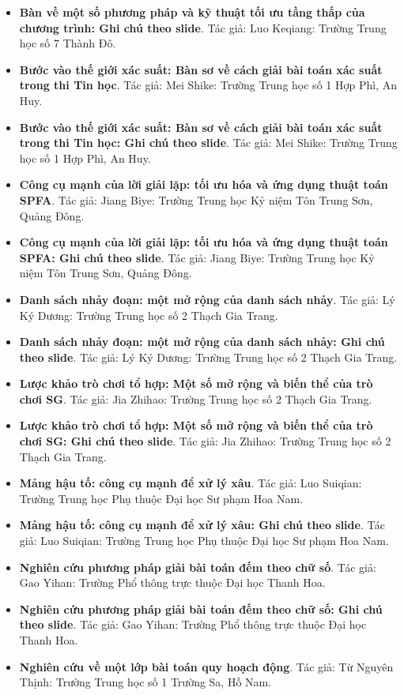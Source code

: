 \documentclass[11pt]{article}
\begin{document}
\begin{itemize}[leftmargin=2em]
  \item \textbf{Bàn về một số phương pháp và kỹ thuật tối ưu tầng thấp của chương trình: Ghi chú theo slide}. Tác giả: Luo Keqiang: Trường Trung học số 7 Thành Đô.
  \item \textbf{Bước vào thế giới xác suất: Bàn sơ về cách giải bài toán xác suất trong thi Tin học}. Tác giả: Mei Shike: Trường Trung học số 1 Hợp Phì, An Huy.
  \item \textbf{Bước vào thế giới xác suất: Bàn sơ về cách giải bài toán xác suất trong thi Tin học: Ghi chú theo slide}. Tác giả: Mei Shike: Trường Trung học số 1 Hợp Phì, An Huy.
  \item \textbf{Công cụ mạnh của lời giải lặp: tối ưu hóa và ứng dụng thuật toán SPFA}. Tác giả: Jiang Biye: Trường Trung học Kỷ niệm Tôn Trung Sơn, Quảng Đông.
  \item \textbf{Công cụ mạnh của lời giải lặp: tối ưu hóa và ứng dụng thuật toán SPFA: Ghi chú theo slide}. Tác giả: Jiang Biye: Trường Trung học Kỷ niệm Tôn Trung Sơn, Quảng Đông.
  \item \textbf{Danh sách nhảy đoạn: một mở rộng của danh sách nhảy}. Tác giả: Lý Ký Dương: Trường Trung học số 2 Thạch Gia Trang.
  \item \textbf{Danh sách nhảy đoạn: một mở rộng của danh sách nhảy: Ghi chú theo slide}. Tác giả: Lý Ký Dương: Trường Trung học số 2 Thạch Gia Trang.
  \item \textbf{Lược khảo trò chơi tổ hợp: Một số mở rộng và biến thể của trò chơi SG}. Tác giả: Jia Zhihao: Trường Trung học số 2 Thạch Gia Trang.
  \item \textbf{Lược khảo trò chơi tổ hợp: Một số mở rộng và biến thể của trò chơi SG: Ghi chú theo slide}. Tác giả: Jia Zhihao: Trường Trung học số 2 Thạch Gia Trang.
  \item \textbf{Mảng hậu tố: công cụ mạnh để xử lý xâu}. Tác giả: Luo Suiqian: Trường Trung học Phụ thuộc Đại học Sư phạm Hoa Nam.
  \item \textbf{Mảng hậu tố: công cụ mạnh để xử lý xâu: Ghi chú theo slide}. Tác giả: Luo Suiqian: Trường Trung học Phụ thuộc Đại học Sư phạm Hoa Nam.
  \item \textbf{Nghiên cứu phương pháp giải bài toán đếm theo chữ số}. Tác giả: Gao Yihan: Trường Phổ thông trực thuộc Đại học Thanh Hoa.
  \item \textbf{Nghiên cứu phương pháp giải bài toán đếm theo chữ số: Ghi chú theo slide}. Tác giả: Gao Yihan: Trường Phổ thông trực thuộc Đại học Thanh Hoa.
  \item \textbf{Nghiên cứu về một lớp bài toán quy hoạch động}. Tác giả: Từ Nguyên Thịnh: Trường Trung học số 1 Trường Sa, Hồ Nam.

\end{itemize}
\end{document}
